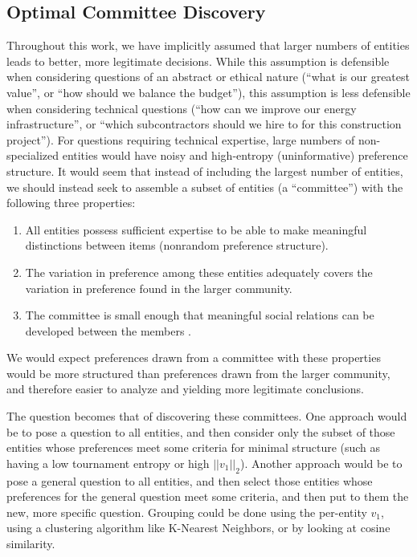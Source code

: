 \subsection{Optimal Committee Discovery}

Throughout this work, we have implicitly assumed that larger numbers of entities leads to better, more legitimate decisions.
While this assumption is defensible when considering questions of an abstract or ethical nature (``what is our greatest value'', or ``how should we balance the budget''), this assumption is less defensible when considering technical questions (``how can we improve our energy infrastructure'', or ``which subcontractors should we hire to for this construction project'').
For questions requiring technical expertise, large numbers of non-specialized entities would have noisy and high-entropy (uninformative) preference structure.
It would seem that instead of including the largest number of entities, we should instead seek to assemble a subset of entities (a ``committee'') with the following three properties:

\begin{enumerate}
	\item All entities possess sufficient expertise to be able to make meaningful distinctions between items (nonrandom preference structure).
	\item The variation in preference among these entities adequately covers the variation in preference found in the larger community.
	\item The committee is small enough that meaningful social relations can be developed between the members \citep{dunbar:1992}.
\end{enumerate} 

We would expect preferences drawn from a committee with these properties would be more structured than preferences drawn from the larger community, and therefore easier to analyze and yielding more legitimate conclusions.

\bigskip

The question becomes that of discovering these committees.
One approach would be to pose a question to  all entities, and then consider only the subset of those entities whose preferences meet some criteria for minimal structure (such as having a low tournament entropy or high $||v_1||_2$).
Another approach would be to pose a general question to all entities, and then select those entities whose preferences for the general question meet some criteria, and then put to them the new, more specific question.
Grouping could be done using the per-entity $v_1$, using a clustering algorithm like K-Nearest Neighbors, or by looking at cosine similarity.

